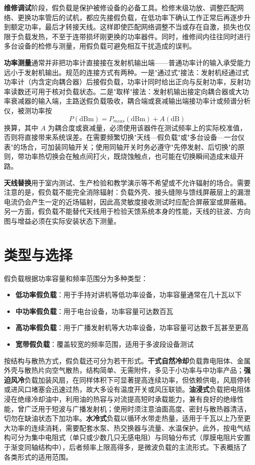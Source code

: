 \textbf{维修调试}阶段，假负载是保护被修设备的必备工具。检修末级功放、调整匹配网络、更换功率管后的试机，都应先接假负载，在低功率下确认工作正常后再逐步升到额定功率，最后才转接天线。这样即使匹配网络调整不当或存在自激，损失也仅限于负载发热，不至于连带损坏刚更换的功率器件。同时，维修间内往往同时进行多台设备的检修与测量，用假负载可避免相互干扰造成的误判。

\textbf{功率测量}通常并非把功率计直接接在发射机输出端——普通功率计的输入承受能力远小于发射机输出。规范的连接方式有两种。一是"通过式"接法：发射机经通过式功率计（内含定向耦合器）后接假负载，功率计同时给出正向与反射功率，反射功率读数还可用于核对负载状态。二是"取样"接法：发射机输出接定向耦合器或大功率衰减器的输入端，主路送假负载吸收，耦合端或衰减输出端接功率计或频谱分析仪，被测功率按
\[
P(\mathrm{dBm}) = P_{meas}(\mathrm{dBm}) + A(\mathrm{dB})
\]
换算，其中 $A$ 为耦合度或衰减量，必须使用该器件在测试频率上的实际校准值，否则将直接带来系统误差。在需要频繁切换"天线—假负载"或"多台设备—一台仪表"的场合，可加装同轴开关；使用同轴开关时务必遵守"先停发射、后切换"的原则，带功率热切换会在触点间打火，既烧蚀触点，也可能在切换瞬间造成末级开路。

\textbf{天线替换}用于室内测试、生产检验和教学演示等不希望或不允许辐射的场合。需要注意的是，假负载不能完全消除辐射：负载外壳、接头缝隙与馈线屏蔽层上的漏泄电流仍会产生一定的近场辐射，因此高灵敏度接收测试时应配合屏蔽室或屏蔽箱。另一方面，假负载不能替代天线用于检验天馈系统本身的性能，天线的驻波、方向图与增益必须在实际安装状态下测量。

\section{类型与选择}
\label{sec:dummy_load_types}

假负载根据功率容量和频率范围分为多种类型：

\begin{itemize}
    \item \textbf{低功率假负载}：用于手持对讲机等低功率设备，功率容量通常在几十瓦以下
    \item \textbf{中功率假负载}：用于电台设备，功率容量可达数百瓦
    \item \textbf{高功率假负载}：用于广播发射机等大功率设备，功率容量可达数千瓦甚至更高
    \item \textbf{宽带假负载}：覆盖较宽的频率范围，适用于多波段设备测试
\end{itemize}

按结构与散热方式，假负载还可分为若干形式。\textbf{干式自然冷却}负载靠电阻体、金属外壳与散热片向空气散热，结构简单、无需附件，多见于小功率与中功率产品；\textbf{强迫风冷}负载加装风扇，在同样体积下可显著提高连续功率，但依赖供电，风扇停转或进风口堵塞会迅速过热，故大多设有温度开关或风压联锁。\textbf{油浸式}负载把电阻体浸在绝缘冷却油中，利用油的热容与对流提高短时承载能力，兼有良好的绝缘性能，曾广泛用于短波与广播发射机；使用时须注意油面高度、密封与散热器清洁，切勿在缺油状态下加功率。\textbf{水冷式}负载以循环水带走热量，适用于千瓦以上乃至更大功率的连续消耗，需要配套水泵、热交换器与流量、水温保护。此外，按电气结构可分为集中电阻式（单只或少数几只无感电阻）与同轴分布式（厚膜电阻片安置于渐变同轴结构中），后者频率上限高得多，是微波负载的主流形式。下表概括了各类形式的适用范围。


